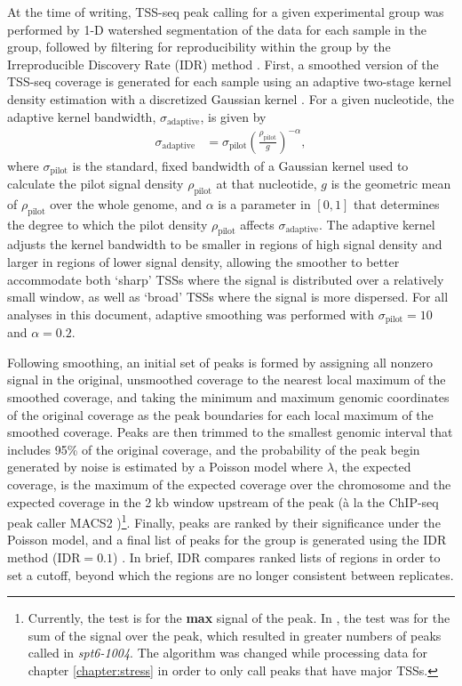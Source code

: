 At the time of writing, TSS-seq peak calling for a given experimental group was performed by 1-D watershed segmentation of the data for each sample in the group, followed by filtering for reproducibility within the group by the Irreproducible Discovery Rate (IDR) method \citep{li2011}.
First, a smoothed version of the TSS-seq coverage is generated for each sample using an adaptive two-stage kernel density estimation with a discretized Gaussian kernel \citep{silverman1986}.
For a given nucleotide, the adaptive kernel bandwidth, $\sigma_{\text{adaptive}}$, is given by
\begin{align*}
    \sigma_{\text{adaptive}} &= \sigma_\text{pilot} \left( \frac{\rho_{\text{pilot}}}{g} \right)^{-\alpha},
\end{align*}
where $\sigma_\text{pilot}$ is the standard, fixed bandwidth of a Gaussian kernel used to calculate the pilot signal density $\rho_\text{pilot}$ at that nucleotide, $g$ is the geometric mean of $\rho_\text{pilot}$ over the whole genome, and $\alpha$ is a parameter in $[0,1]$ that determines the degree to which the pilot density $\rho_\text{pilot}$ affects $\sigma_\text{adaptive}$.
The adaptive kernel adjusts the kernel bandwidth to be smaller in regions of high signal density and larger in regions of lower signal density, allowing the smoother to better accommodate both `sharp' TSSs where the signal is distributed over a relatively small window, as well as `broad' TSSs where the signal is more dispersed.
For all analyses in this document, adaptive smoothing was performed with $\sigma_\text{pilot} = 10$ and $\alpha = 0.2$.

Following smoothing, an initial set of peaks is formed by assigning all nonzero signal in the original, unsmoothed coverage to the nearest local maximum of the smoothed coverage, and taking the minimum and maximum genomic coordinates of the original coverage as the peak boundaries for each local maximum of the smoothed coverage.
Peaks are then trimmed to the smallest genomic interval that includes 95\% of the original coverage, and the probability of the peak begin generated by noise is estimated by a Poisson model where $\lambda$, the expected coverage, is the maximum of the expected coverage over the chromosome and the expected coverage in the 2 kb window upstream of the peak (\`a la the ChIP-seq peak caller MACS2 \citep{zhang2008})\footnote{Currently, the test is for the \textbf{max} signal of the peak. In \citet{doris2018}, the test was for the sum of the signal over the peak, which resulted in greater numbers of peaks called in \textit{spt6-1004}. The algorithm was changed while processing data for chapter \ref{chapter:stress} in order to only call peaks that have major TSSs.}.
Finally, peaks are ranked by their significance under the Poisson model, and a final list of peaks for the group is generated using the IDR method ($\text{IDR}=0.1$) \citep{li2011}.
In brief, IDR compares ranked lists of regions in order to set a cutoff, beyond which the regions are no longer consistent between replicates.

